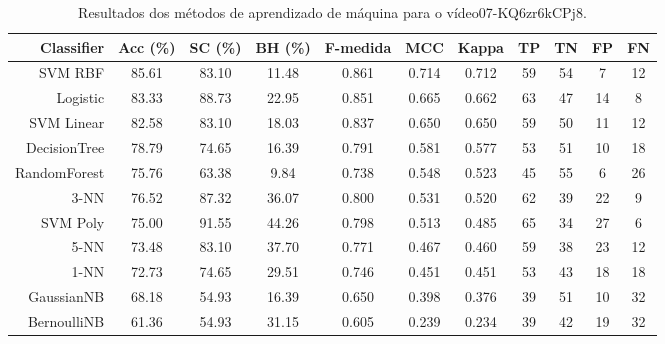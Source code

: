 \begin{table}[!htb]
\centering
\caption{Resultados dos métodos de aprendizado de máquina para o vídeo07-KQ6zr6kCPj8.}
\label{tab:07-KQ6zr6kCPj8}
\begin{tabular}{r|c|c|c|c|c|c|c|c|c|c}
\hline\hline
Classifier & Acc (\%) & SC (\%) & BH (\%) & F-medida & MCC & Kappa & TP & TN & FP & FN \\ \hline
SVM RBF & 85.61 & 83.10 & 11.48 & 0.861 & 0.714 & 0.712 & 59 & 54 & 7 & 12 \\ 
Logistic & 83.33 & 88.73 & 22.95 & 0.851 & 0.665 & 0.662 & 63 & 47 & 14 & 8 \\ 
SVM Linear & 82.58 & 83.10 & 18.03 & 0.837 & 0.650 & 0.650 & 59 & 50 & 11 & 12 \\ 
DecisionTree & 78.79 & 74.65 & 16.39 & 0.791 & 0.581 & 0.577 & 53 & 51 & 10 & 18 \\ 
RandomForest & 75.76 & 63.38 & 9.84 & 0.738 & 0.548 & 0.523 & 45 & 55 & 6 & 26 \\ 
3-NN & 76.52 & 87.32 & 36.07 & 0.800 & 0.531 & 0.520 & 62 & 39 & 22 & 9 \\ 
SVM Poly & 75.00 & 91.55 & 44.26 & 0.798 & 0.513 & 0.485 & 65 & 34 & 27 & 6 \\ 
5-NN & 73.48 & 83.10 & 37.70 & 0.771 & 0.467 & 0.460 & 59 & 38 & 23 & 12 \\ 
1-NN & 72.73 & 74.65 & 29.51 & 0.746 & 0.451 & 0.451 & 53 & 43 & 18 & 18 \\ 
GaussianNB & 68.18 & 54.93 & 16.39 & 0.650 & 0.398 & 0.376 & 39 & 51 & 10 & 32 \\ 
BernoulliNB & 61.36 & 54.93 & 31.15 & 0.605 & 0.239 & 0.234 & 39 & 42 & 19 & 32 \\ 
\hline\hline
\end{tabular}
\end{table}
